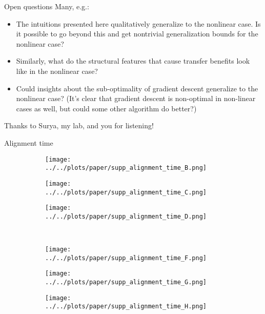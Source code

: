 \documentclass{beamer}
\begin{document}
\begin{frame}{Open questions}
Many, e.g.:
\begin{itemize}
\item The intuitions presented here qualitatively generalize to the nonlinear case. Is it possible to go beyond this and get nontrivial generalization bounds for the nonlinear case? 
\item Similarly, what do the structural features that cause transfer benefits look like in the nonlinear case?
\item Could insights about the sub-optimality of gradient descent generalize to the nonlinear case? (It's clear that gradient descent is non-optimal in non-linear cases as well, but could some other algorithm do better?)
\end{itemize}
\end{frame}

\begin{frame}[standout]
Thanks to Surya, my lab, and you for listening!
\end{frame}

\begin{frame}[allowframebreaks]


{}

\end{frame}

\appendix
\begin{frame}{Alignment time}
\begin{figure}
\centering
\begin{subfigure}[t]{0.3\textwidth}
\texttt{[image: ../../plots/paper/supp\_alignment\_time\_B.png]}
\end{subfigure}%
\begin{subfigure}[t]{0.3\textwidth}
\texttt{[image: ../../plots/paper/supp\_alignment\_time\_C.png]}
\end{subfigure}%
\begin{subfigure}[t]{0.4\textwidth}
\texttt{[image: ../../plots/paper/supp\_alignment\_time\_D.png]}
\end{subfigure}\\
\begin{subfigure}[t]{0.3\textwidth}
\texttt{[image: ../../plots/paper/supp\_alignment\_time\_F.png]}
\end{subfigure}%
\begin{subfigure}[t]{0.3\textwidth}
\texttt{[image: ../../plots/paper/supp\_alignment\_time\_G.png]}
\end{subfigure}%
\begin{subfigure}[t]{0.4\textwidth}
\texttt{[image: ../../plots/paper/supp\_alignment\_time\_H.png]}
\end{subfigure}
\end{figure}

\end{frame}
\end{document}
